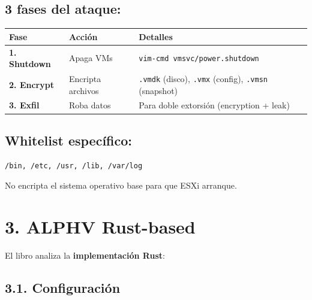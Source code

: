 \documentclass[
  letterpaper,
]{report}
\newcounter{none} %
\begin{document}
\subsection{3 fases del ataque:}\label{fases-del-ataque}

{\def\LTcaptype{none} %
\begin{longtable}[]{@{}
  >{\raggedright\arraybackslash}p{}
  >{\raggedright\arraybackslash}p{}
  >{\raggedright\arraybackslash}p{}@{}}
\toprule\noalign{}
\begin{minipage}[b]{\linewidth}\raggedright
Fase
\end{minipage} & \begin{minipage}[b]{\linewidth}\raggedright
Acción
\end{minipage} & \begin{minipage}[b]{\linewidth}\raggedright
Detalles
\end{minipage} \\
\midrule\noalign{}
\endhead
\bottomrule\noalign{}
\endlastfoot
\textbf{1. Shutdown} & Apaga VMs &
\texttt{vim-cmd\ vmsvc/power.shutdown} \\
\textbf{2. Encrypt} & Encripta archivos & \texttt{.vmdk} (disco),
\texttt{.vmx} (config), \texttt{.vmsn} (snapshot) \\
\textbf{3. Exfil} & Roba datos & Para doble extorsión (encryption +
leak) \\
\end{longtable}
}

\subsection{Whitelist específico:}\label{whitelist-especuxedfico}

\begin{verbatim}
/bin, /etc, /usr, /lib, /var/log
\end{verbatim}

No encripta el sistema operativo base para que ESXi arranque.

\section{3. ALPHV Rust-based}\label{alphv-rust-based}

El libro analiza la \textbf{implementación Rust}:

\subsection{3.1. Configuración}\label{configuraciuxf3n}
\end{document}
